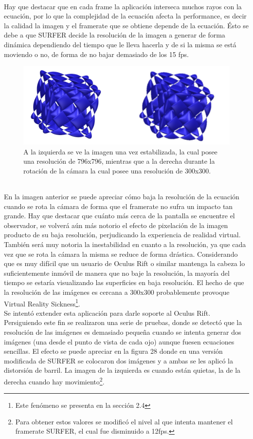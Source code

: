 \documentclass[12pt]{article}
\begin{document}
\\Hay que destacar que en cada frame la aplicación interseca muchos rayos con la ecuación, por lo que la complejidad de la ecuación afecta la performance, es decir la calidad la imagen  y el framerate que se obtiene depende de la ecuación. Ésto se debe a que SURFER decide la resolución de la imagen a generar de forma dinámica dependiendo del tiempo que le lleva hacerla y de si la misma se está moviendo o no, de forma de no bajar demasiado de los 15 fps.
\begin{figure}[h]
\includegraphics[width=\textwidth]{surfer_en_movimiento.png}
\caption{A la izquierda se ve la imagen una vez estabilizada, la cual posee una resolución de 796x796, mientras que a la derecha durante la rotación de la cámara la cual posee una resolución de 300x300.}
\end{figure}
\\En la imagen anterior se puede apreciar cómo baja la resolución de la ecuación cuando se rota la cámara de forma  que el framerate no sufra un impacto tan grande. Hay que destacar que cuánto más cerca de la pantalla se encuentre el observador, se volverá aún más notorio el efecto de pixelación de la imagen producto de su baja resolución, perjudicando la experiencia de realidad virtual. También será muy notoria la inestabilidad en cuanto a la resolución, ya que cada vez que se rota la cámara la misma se reduce de forma drástica. Considerando que es muy difícil que un  usuario de Oculus Rift o similar mantenga la cabeza lo suficientemente inmóvil de manera que no baje la resolución, la mayoría del tiempo se estaría visualizando las superficies en baja resolución. El hecho de que la resolución de las imágenes es cercana a 300x300 probablemente provoque Virtual Reality Sickness\footnote{Este fenómeno se presenta en la sección 2.4}.
\\Se intentó extender esta aplicación para darle soporte al Oculus Rift. Persiguiendo este fin se realizaron una serie de pruebas, donde se detectó que la resolución de las imágenes es demasiado pequeña cuando se intenta generar dos imágenes (una desde el punto de vista de cada ojo) aunque fuesen ecuaciones sencillas. El efecto se puede apreciar en la figura 28 donde en una versión modificada de SURFER se colocaron dos imágenes y a ambas se les aplicó la distorsión de barril. La imagen de la izquierda es cuando están quietas, la de la derecha cuando hay movimiento\footnote{Para obtener estos valores se modificó el nivel al que intenta mantener el framerate SURFER, el cual fue disminuido a 12fps.}.
\end{document}
